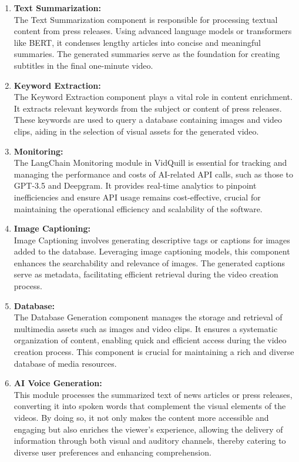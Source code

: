 \documentclass[12pt]{article}
\begin{document}
\justify \hspace{5mm}  
\begin{enumerate}
\item \textbf{Text Summarization: } \\ The Text Summarization component is responsible for processing textual content from press releases. Using advanced language models or transformers like BERT, it condenses lengthy articles into concise and meaningful summaries. The generated summaries serve as the foundation for creating subtitles in the final one-minute video.

\item \textbf{Keyword Extraction: } \\ The Keyword Extraction component plays a vital role in content enrichment. It extracts relevant keywords from the subject or content of press releases. These keywords are used to query a database containing images and video clips, aiding in the selection of visual assets for the generated video.

\item \textbf{Monitoring: } \\ The LangChain Monitoring module in VidQuill is essential for tracking and managing the performance and costs of AI-related API calls, such as those to GPT-3.5 and Deepgram. It provides real-time analytics to pinpoint inefficiencies and ensure API usage remains cost-effective, crucial for maintaining the operational efficiency and scalability of the software.

\item \textbf{Image Captioning: } \\ Image Captioning involves generating descriptive tags or captions for images added to the database. Leveraging image captioning models, this component enhances the searchability and relevance of images. The generated captions serve as metadata, facilitating efficient retrieval during the video creation process.

\item \textbf{Database: } \\ The Database Generation component manages the storage and retrieval of multimedia assets such as images and video clips. It ensures a systematic organization of content, enabling quick and efficient access during the video creation process. This component is crucial for maintaining a rich and diverse database of media resources.

\item \textbf{AI Voice Generation: } \\ This module processes the summarized text of news articles or press releases, converting it into spoken words that complement the visual elements of the videos. By doing so, it not only makes the content more accessible and engaging but also enriches the viewer's experience, allowing the delivery of information through both visual and auditory channels, thereby catering to diverse user preferences and enhancing comprehension.


\end{enumerate}
\end{document}

